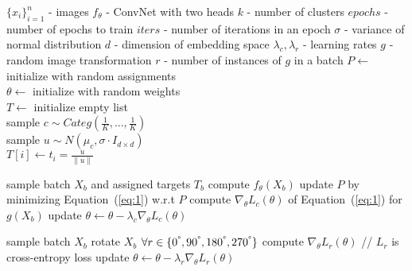 \documentclass[a4paper,conference]{IEEEtran}
\begin{document}
\begin{algorithm}[bt]
\caption{}
\label{algo:1}
\begin{algorithmic}
    \newline
       $\{x_i\}^{n}_{i=1}$ - images \newline
       $f_\theta$ - ConvNet with two heads \newline
       $k$ - number of clusters \newline
       $epochs$ - number of epochs to train \newline
       $iters$ - number of iterations in an epoch \newline
       $\sigma$ - variance of normal distribution \newline
       $d$ - dimension of embedding space \newline
       $\lambda_c, \lambda_r$ - learning rates \newline
       $g$ - random image transformation \newline
       $r$ - number of instances of $g$ in a batch
    \newline
       $P\leftarrow$  initialize with random assignments \\
       $\theta \leftarrow$ initialize with random weights \\
       $T \leftarrow$ initialize empty list \\
    \STATE sample $c \sim Categ(\frac{1}{K},...,\frac{1}{K})$ \\
    \STATE sample $u \sim N(\mu_c,\sigma \cdot I_{d \times d})$\\
    \STATE $T[i] \leftarrow t_i=\frac{u}{\|u\|}$
    \ENDFOR
   
       \STATE sample batch $X_b$ and assigned targets $T_b$
       \STATE compute $f_\theta (X_b)$
       \STATE update $P$ by minimizing Equation~(\ref{eq:1}) w.r.t $P$
       \STATE compute $\nabla_\theta L_c(\theta)$ of Equation~(\ref{eq:1}) for $g(X_b)$
       \STATE update $\theta \leftarrow \theta - \lambda_c \nabla_\theta L_c(\theta)$
     \ENDFOR
     
       \STATE sample batch $X_b$
       \STATE rotate $X_b$  $\forall r\in \{ 0^{\degree}, 90^{\degree}, 180^{\degree}, 270^{\degree}\}$
       \STATE compute $\nabla_\theta L_r(\theta)$  // $L_r$ is cross-entropy loss
       \STATE update $\theta \leftarrow \theta - \lambda_r \nabla_\theta L_r(\theta)$
       
     \ENDFOR
     \ENDFOR
\end{algorithmic}
\end{algorithm}
\end{document}
